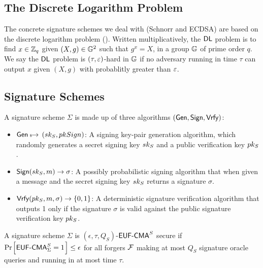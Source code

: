 \subsection{The Discrete Logarithm Problem}

The concrete signature schemes we deal with (Schnorr and ECDSA) are based on the discrete logarithm problem (\DLOG).
Written multiplicatively, the $\textsf{DL}$ problem is to find $x \in \mathbb{Z}_q$ given $(X,g) \in \mathbb{G}^{2}$ such that $g^x = X$, in a group $\mathbb{G}$ of prime order $q$.
We say the $\textsf{DL}$ problem is $(\tau,\varepsilon)$-hard in $\mathbb{G}$ if no adversary running in time $\tau$ can output $x$ given $(X,g)$ with probablitly greater than $\varepsilon$.

\subsection{Signature Schemes}

\begin{definition}
  \label{signature_scheme}

  A signature scheme $\Sigma$ is made up of three algorithms $(\textsf{Gen}, \textsf{Sign}, \textsf{Vrfy})$:

  \begin{itemize}
  \item $\textsf{Gen} \hskip2.3pt{\mbox{\tiny${\$}$\normalsize}}\!\!\rightarrow\, (sk_S, pkSign)$: A signing key-pair generation algorithm, which randomly generates a secret signing key $sk_S$ and a public verification key $pk_S$.
  \item $\textsf{Sign}(sk_S, m) \rightarrow \sigma$: A possibly probabilistic signing algorithm that when given a message and the secret signing key $sk_S$ returns a signature $\sigma$.
  \item $\textsf{Vrfy}(pk_S, m, \sigma) \rightarrow \{0,1\}$: A deterministic signature verification algorithm that outputs 1 only if the signature $\sigma$ is valid against the public signature verification key $pk_S$.
  \end{itemize}

\end{definition}

\begin{definition}[$\EUFCMA$]
  \label{EUFCMA}
    A signature scheme $\Sigma$ is $(\epsilon, \tau, Q_S)$-$\EUFCMA$ secure if $\prob{ \EUFCMA_{\Sigma} = 1} \leq \epsilon$ for all forgers $\mathcal{F}$ making at most $Q_S$ signature oracle queries and running in at most time $\tau$.
\begin{center}
\end{center}

\end{definition}


